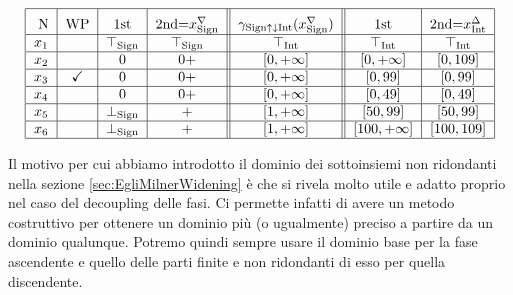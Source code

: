 \begin{example}
\begin{table}[H]
\begin{minipage}{\textwidth}
\[\begin{tabular}{|c|c|c|c||c||c|c|c||}
        \hline 
        \rule{0pt}{14pt} N & WP & 1st & 2nd=\(x^{\nabla}_{\textrm{Sign}}\) & 
        \(\gamma_{\textrm{Sign}\uparrow\downarrow\textrm{Int}}(x^{\nabla}_{\textrm{Sign}})\)& 
        1st & 2nd=\(x^{\Delta}_{\textrm{Int}}\)  \\
        \hline
        $x_1$ &  &  
            $\top_{\textrm{Sign}}$ & $\top_{\textrm{Sign}}$ & 
            $\top_{\textrm{Int}}$ & 
            $\top_{\textrm{Int}}$ & $\top_{\textrm{Int}}$ \\
        \hline
        $x_2$ &  & 
            0 & 0+ & 
            $\left[0, +\infty \right]$ & 
            $\left[0, +\infty \right]$ & $\left[0, 109\right]$ \\
        \hline
        $x_3$ & \checkmark & 
            0 & 0+ & 
            $\left[0, +\infty \right]$ & 
            $\left[0, 99\right]$ & $\left[0, 99\right]$ \\
        \hline
        $x_4$ &  & 
            0 & 0+ & 
            $\left[0, +\infty\right]$ & 
            $\left[0, 49\right]$ & $\left[0, 49\right]$ \\
        \hline
        $x_5$ &  & 
            $\perp_{\textrm{Sign}}$ & + & 
            $\left[1, +\infty \right]$ & 
            $\left[50, 99\right]$ & $\left[50, 99\right]$ \\
        \hline
        $x_6$ &  & 
            $\perp_{\textrm{Sign}}$ & + & 
            $\left[1, +\infty \right]$ & 
            $\left[100, +\infty \right]$ & $\left[100, 109\right]$ \\
        \hline
        \end{tabular}
        \]
    \end{minipage}
    \caption{tabella dei risultati del dominio \(\textrm{Sign}\uparrow\downarrow\textrm{Int}\) divisi per step e fase.}
    \label{fig:risDecSingInt}
\end{table}
\end{example}

Il motivo per cui abbiamo introdotto il dominio dei sottoinsiemi non ridondanti nella sezione \ref{sec:EgliMilnerWidening} è che si rivela molto utile e adatto proprio nel caso del decoupling delle fasi. Ci permette infatti di avere un metodo costruttivo per ottenere un dominio più (o ugualmente) preciso a partire da un dominio qualunque. Potremo quindi sempre usare il dominio base per la fase ascendente e quello delle parti finite e non ridondanti di esso per quella discendente. 

